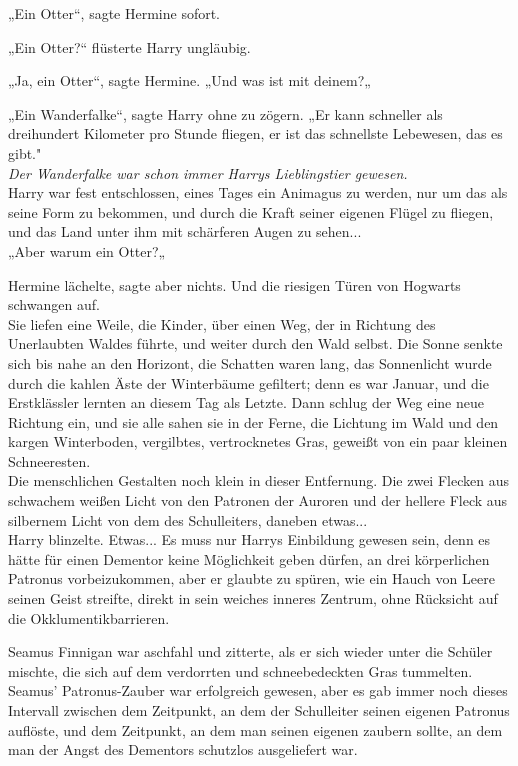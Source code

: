 {„Ein Otter“, sagte Hermine sofort.

„Ein Otter?“ flüsterte Harry ungläubig.

„Ja, ein Otter“, sagte Hermine. „Und was ist mit deinem?„

„Ein Wanderfalke“, sagte Harry ohne zu zögern. „Er kann schneller als dreihundert Kilometer pro Stunde fliegen, er ist das schnellste Lebewesen, das es gibt."\\ \emph{Der Wanderfalke war schon immer Harrys Lieblingstier gewesen.}\\ Harry war fest entschlossen, eines Tages ein Animagus zu werden, nur um das als seine Form zu bekommen, und durch die Kraft seiner eigenen Flügel zu fliegen, und das Land unter ihm mit schärferen Augen zu sehen...\\ „Aber warum ein Otter?„

Hermine lächelte, sagte aber nichts. Und die riesigen Türen von Hogwarts schwangen auf.\\ Sie liefen eine Weile, die Kinder, über einen Weg, der in Richtung des Unerlaubten Waldes führte, und weiter durch den Wald selbst. Die Sonne senkte sich bis nahe an den Horizont, die Schatten waren lang, das Sonnenlicht wurde durch die kahlen Äste der Winterbäume gefiltert; denn es war Januar, und die Erstklässler lernten an diesem Tag als Letzte. Dann schlug der Weg eine neue Richtung ein, und sie alle sahen sie in der Ferne, die Lichtung im Wald und den kargen Winterboden, vergilbtes, vertrocknetes Gras, geweißt von ein paar kleinen Schneeresten.\\ Die menschlichen Gestalten noch klein in dieser Entfernung. Die zwei Flecken aus schwachem weißen Licht von den Patronen der Auroren und der hellere Fleck aus silbernem Licht von dem des Schulleiters, daneben etwas...\\ Harry blinzelte. Etwas... Es muss nur Harrys Einbildung gewesen sein, denn es hätte für einen Dementor keine Möglichkeit geben dürfen, an drei körperlichen Patronus vorbeizukommen, aber er glaubte zu spüren, wie ein Hauch von Leere seinen Geist streifte, direkt in sein weiches inneres Zentrum, ohne Rücksicht auf die Okklumentikbarrieren.

Seamus Finnigan war aschfahl und zitterte, als er sich wieder unter die Schüler mischte, die sich auf dem verdorrten und schneebedeckten Gras tummelten. Seamus' Patronus-Zauber war erfolgreich gewesen, aber es gab immer noch dieses Intervall zwischen dem Zeitpunkt, an dem der Schulleiter seinen eigenen Patronus auflöste, und dem Zeitpunkt, an dem man seinen eigenen zaubern sollte, an dem man der Angst des Dementors schutzlos ausgeliefert war.

}
